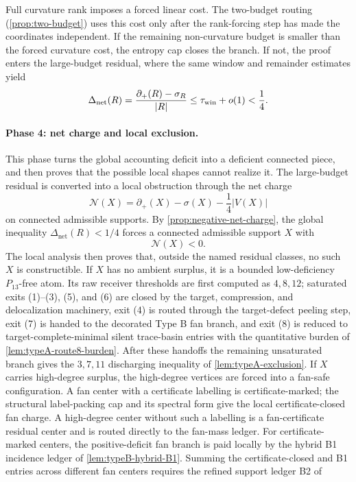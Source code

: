 \documentclass[11pt]{article}
\newcommand{\defp}{\partial_+}
\newcommand{\No}{\mathcal N}
\begin{document}
Full curvature rank imposes a forced linear cost.  The two-budget routing
(\cref{prop:two-budget}) uses this cost only after the rank-forcing step has
made the coordinates independent.  If the remaining non-curvature budget is
smaller than the forced curvature cost, the entropy cap closes the branch.  If
not, the proof enters the large-budget residual, where the same window and
remainder estimates yield
\[
\Delta_{\mathrm{net}}(R)
=\frac{\defp(R)-\sigma_R}{|R|}
\le \tau_{\rm win}+o(1)<\frac14 .
\]

\paragraph{Phase 4: net charge and local exclusion.}
This phase turns the global accounting deficit into a deficient connected
piece, and then proves that the possible local shapes cannot realize it.
The large-budget residual is converted into a local obstruction through the net
charge
\[
\No(X)=\defp(X)-\sigma(X)-\frac14|V(X)|
\]
on connected admissible supports.  By
\cref{prop:negative-net-charge}, the global inequality
$\Delta_{\mathrm{net}}(R)<1/4$ forces a connected admissible support $X$ with
\[
\No(X)<0 .
\]
The local analysis then proves that, outside the named residual classes, no
such $X$ is constructible.  If $X$ has no ambient surplus, it is a bounded
low-deficiency $P_{13}$-free atom.  Its raw receiver thresholds are first
computed as $4,8,12$; saturated exits (1)--(3), (5), and (6) are closed by the
target, compression, and delocalization machinery, exit (4) is routed through
the target-defect peeling step, exit (7) is handed to the decorated Type B fan
branch, and exit (8) is reduced to target-complete-minimal silent trace-basin
entries with the quantitative burden of
\cref{lem:typeA-route8-burden}.  After these handoffs the remaining
unsaturated branch gives the $3,7,11$ discharging inequality of
\cref{lem:typeA-exclusion}.
If $X$ carries high-degree surplus, the high-degree vertices are forced into a
fan-safe configuration.  A fan center with a certificate labelling is
certificate-marked; the structural label-packing cap and its spectral form give
the local certificate-closed fan charge.  A high-degree center without such a
labelling is a fan-certificate residual center and is routed directly to the
fan-mass ledger.  For certificate-marked centers, the positive-deficit fan branch
is paid locally by the hybrid B1 incidence ledger of
\cref{lem:typeB-hybrid-B1}.  Summing the certificate-closed and B1 entries
across different fan centers requires the refined support ledger B2 of
\end{document}
